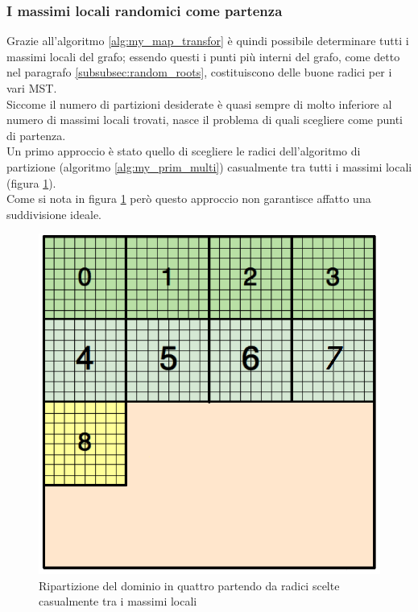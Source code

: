 {\subsubsection{I massimi locali randomici come partenza}
Grazie all'algoritmo \ref{alg:my_map_transfor} è quindi possibile determinare tutti i massimi locali del grafo; essendo questi i punti più interni del grafo, come detto nel paragrafo \ref{subsubsec:random_roots}, costituiscono delle buone radici per i vari MST.\\
Siccome il numero di partizioni desiderate è quasi sempre di molto inferiore al numero di massimi locali trovati, nasce il problema di quali scegliere come punti di partenza.\\
Un primo approccio è stato quello di scegliere le radici dell'algoritmo di partizione (algoritmo \ref{alg:my_prim_multi}) casualmente tra tutti i massimi locali (figura \ref{fig:randomo_local_max}).\\
Come si nota in figura \ref{fig:randomo_local_max} però questo approccio non garantisce affatto una suddivisione ideale.
\begin{figure}[H]
	\centering
	\includegraphics[width=1.0\textwidth]{immagini/block_on_grid.png}
	\caption{Ripartizione del dominio in quattro partendo da radici scelte casualmente tra i massimi locali}
	\label{fig:randomo_local_max}
\end{figure}


}
